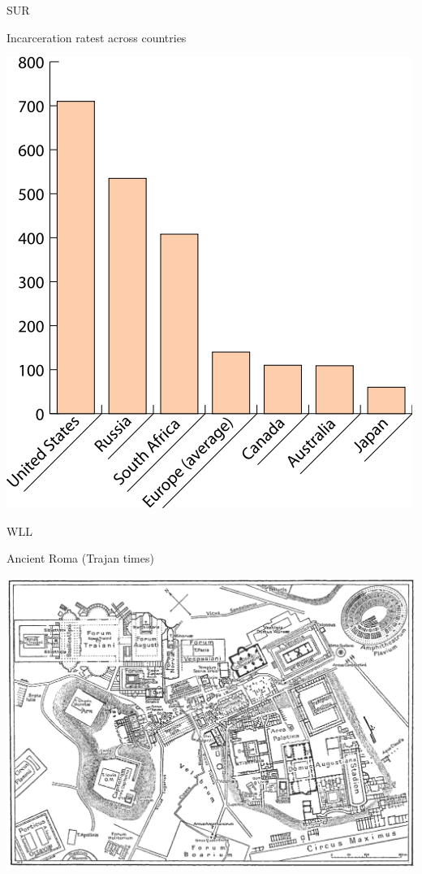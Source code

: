 \begin{chart}{S}{UR}
\caption{Incarceration ratest across countries}
\label{chart:incarceration}
\includegraphics[width=\chartwidth,height=\chartheight]{incarceration}  
\end{chart}

\begin{map}{W}{LL}
\caption{Ancient Roma  (Trajan times)}
\label{map:roma}
\includegraphics[width=\chartwidth,height=\chartheight]{Rome}
\end{map}

